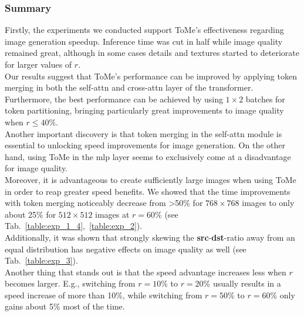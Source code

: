 \subsubsection*{Summary}
Firstly, the experiments we conducted support ToMe's effectiveness regarding image generation speedup. Inference time was cut in half while image quality remained great, although in some cases details and textures started to deteriorate for larger values of \(r\).\\
Our results suggest that ToMe's performance can be improved by applying token merging in both the self-attn and cross-attn layer of the transformer. Furthermore, the best performance can be achieved by using $1 \times 2$ batches for token partitioning, bringing particularly great improvements to image quality when \(r\leq40\%\).\\
Another important discovery is that token merging in the self-attn module is essential to unlocking speed improvements for image generation. On the other hand, using ToMe in the mlp layer seems to exclusively come at a disadvantage for image quality.\\
Moreover, it is advantageous to create sufficiently large images when using ToMe in order to reap greater speed benefits. We showed that the time improvements with token merging noticeably decrease from >50\% for $768 \times 768$ images to only about 25\% for $512 \times 512$ images at \(r=60\%\) (see Tab.~\ref{table:exp_1_4},~\ref{table:exp_2}).\\
Additionally, it was shown that strongly skewing the \textbf{src}-\textbf{dst}-ratio away from an equal distribution has negative effects on image quality as well (see Tab.~\ref{table:exp_3}).\\
Another thing that stands out is that the speed advantage increases less when \(r\) becomes larger. E.g., switching from \(r=10\%\) to \(r=20\%\) usually results in a speed increase of more than 10\%, while switching from \(r=50\%\) to \(r=60\%\) only gains about 5\% most of the time.
